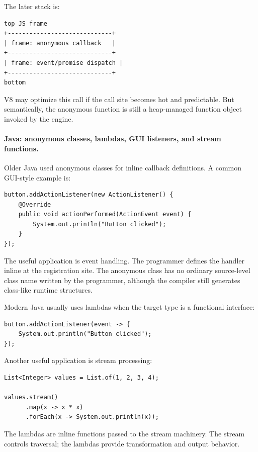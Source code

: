 \documentclass[a4paper,twoside]{report}
\begin{document}
The later stack is:

\begin{verbatim}
top JS frame
+-----------------------------+
| frame: anonymous callback   |
+-----------------------------+
| frame: event/promise dispatch |
+-----------------------------+
bottom
\end{verbatim}

V8 may optimize this call if the call site becomes hot and predictable. But semantically, the anonymous function is still a heap-managed function object invoked by the engine.

\paragraph{Java: anonymous classes, lambdas, GUI listeners, and stream functions.}

Older Java used anonymous classes for inline callback definitions. A common GUI-style example is:

\begin{verbatim}
button.addActionListener(new ActionListener() {
    @Override
    public void actionPerformed(ActionEvent event) {
        System.out.println("Button clicked");
    }
});
\end{verbatim}

The useful application is event handling. The programmer defines the handler inline at the registration site. The anonymous class has no ordinary source-level class name written by the programmer, although the compiler still generates class-like runtime structures.

Modern Java usually uses lambdas when the target type is a functional interface:

\begin{verbatim}
button.addActionListener(event -> {
    System.out.println("Button clicked");
});
\end{verbatim}

Another useful application is stream processing:

\begin{verbatim}
List<Integer> values = List.of(1, 2, 3, 4);

values.stream()
      .map(x -> x * x)
      .forEach(x -> System.out.println(x));
\end{verbatim}

The lambdas are inline functions passed to the stream machinery. The stream controls traversal; the lambdas provide transformation and output behavior.
\end{document}
